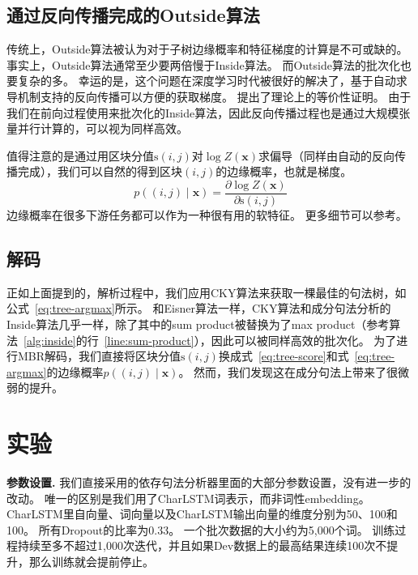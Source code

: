 \subsection{通过反向传播完成的Outside算法}

传统上，Outside算法被认为对于子树边缘概率和特征梯度的计算是不可或缺的。
事实上，Outside算法通常至少要两倍慢于Inside算法。
而Outside算法的批次化也要复杂的多。
幸运的是，这个问题在深度学习时代被很好的解决了，基于自动求导机制支持的反向传播可以方便的获取梯度。
\citet{eisner-2016-inside}提出了理论上的等价性证明。
由于我们在前向过程使用来批次化的Inside算法，因此反向传播过程也是通过大规模张量并行计算的，可以视为同样高效。

值得注意的是通过用区块分值$\mathrm{s}(i,j)$对$\log Z(\boldsymbol{x})$求偏导（同样由自动的反向传播完成），我们可以自然的得到区块$(i,j)$的边缘概率，也就是梯度。
\begin{equation} \label{eq:con-partial-derivative}
	p((i, j)\mid\boldsymbol{x}) = \frac{\partial \log Z(\boldsymbol{x})}{\partial \mathrm{s}(i, j)}
\end{equation}
边缘概率在很多下游任务都可以作为一种很有用的软特征。
更多细节可以参考\citet{eisner-2016-inside}。

\subsection{解码}

正如上面提到的，解析过程中，我们应用CKY算法来获取一棵最佳的句法树，如公式~\ref{eq:tree-argmax}所示。
和Eisner算法一样，CKY算法和成分句法分析的Inside算法几乎一样，除了其中的sum product被替换为了max product（参考算法~\ref{alg:inside}的行~\ref{line:sum-product}），因此可以被同样高效的批次化。
为了进行MBR解码，我们直接将区块分值$\mathrm{s}(i,j)$换成式~\ref{eq:tree-score}和式~\ref{eq:tree-argmax}的边缘概率$p((i,j)\mid\boldsymbol{x})$。
然而，我们发现这在成分句法上带来了很微弱的提升。

\section{实验}
\label{sec:con-experiments}

\noindent\textbf{参数设置.}
我们直接采用\citet{dozat-etal-2017-biaffine}的依存句法分析器里面的大部分参数设置，没有进一步的改动。
唯一的区别是我们用了CharLSTM词表示，而非词性embedding。
CharLSTM里自向量、词向量以及CharLSTM输出向量的维度分别为50、100和100。
所有Dropout的比率为0.33。
一个批次数据的大小约为5,000个词。
训练过程持续至多不超过1,000次迭代，并且如果Dev数据上的最高结果连续100次不提升，那么训练就会提前停止。


